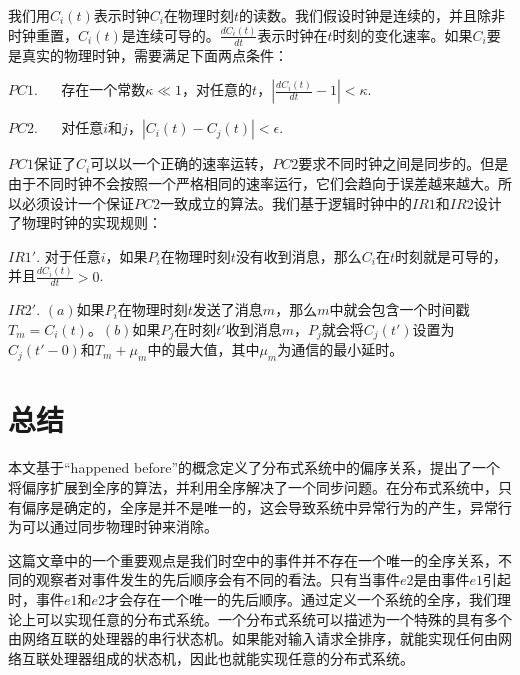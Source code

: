 \documentclass[UTF8]{article}
\begin{document}
	我们用$C_i(t)$表示时钟$C_i$在物理时刻$t$的读数。我们假设时钟是连续的，并且除非时钟重置，$C_i(t)$是连续可导的。$\frac{dC_i(t)}{dt}$表示时钟在$t$时刻的变化速率。如果$C_i$要是真实的物理时钟，需要满足下面两点条件：

	$PC1.$ $\quad$ 存在一个常数$\kappa \ll 1$，对任意的$t$，$|\frac{dC_i(t)}{dt}-1|<\kappa$.

	$PC2.$ $\quad$ 对任意$i$和$j$，$|C_i(t)-C_j(t)|<\epsilon$.

	$PC1$保证了$C_i$可以以一个正确的速率运转，$PC2$要求不同时钟之间是同步的。但是由于不同时钟不会按照一个严格相同的速率运行，它们会趋向于误差越来越大。所以必须设计一个保证$PC2$一致成立的算法。我们基于逻辑时钟中的$IR1$和$IR2$设计了物理时钟的实现规则：
	
	$IR1'.$ \quad 对于任意$i$，如果$P_i$在物理时刻$t$没有收到消息，那么$C_i$在$t$时刻就是可导的，并且$\frac{dC_i(t)}{dt}>0$.

	$IR2'.$ \quad $(a)$如果$P_i$在物理时刻$t$发送了消息$m$，那么$m$中就会包含一个时间戳$T_m=C_i(t)$。$(b)$如果$P_j$在时刻$t'$收到消息$m$，$P_j$就会将$C_j(t')$设置为$C_j(t'-0)$和$T_m+\mu_m$中的最大值，其中$\mu_m$为通信的最小延时。

\section{总结}
	本文基于“happened before”的概念定义了分布式系统中的偏序关系，提出了一个将偏序扩展到全序的算法，并利用全序解决了一个同步问题。在分布式系统中，只有偏序是确定的，全序是并不是唯一的，这会导致系统中异常行为的产生，异常行为可以通过同步物理时钟来消除。
	
	这篇文章中的一个重要观点是我们时空中的事件并不存在一个唯一的全序关系，不同的观察者对事件发生的先后顺序会有不同的看法。只有当事件$e2$是由事件$e1$引起时，事件$e1$和$e2$才会存在一个唯一的先后顺序。通过定义一个系统的全序，我们理论上可以实现任意的分布式系统。一个分布式系统可以描述为一个特殊的具有多个由网络互联的处理器的串行状态机。如果能对输入请求全排序，就能实现任何由网络互联处理器组成的状态机，因此也就能实现任意的分布式系统。
	

\end{document}
